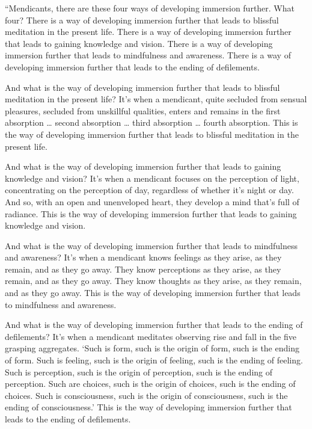 \documentclass[12pt,openany]{book}%
\begin{document}
“Mendicants, there are these four ways of developing immersion further. What four? There is a way of developing immersion further that leads to blissful meditation in the present life. There is a way of developing immersion further that leads to gaining knowledge and vision. There is a way of developing immersion further that leads to mindfulness and awareness. There is a way of developing immersion further that leads to the ending of defilements. 

And what is the way of developing immersion further that leads to blissful meditation in the present life? It’s when a mendicant, quite secluded from sensual pleasures, secluded from unskillful qualities, enters and remains in the first absorption … second absorption … third absorption … fourth absorption. This is the way of developing immersion further that leads to blissful meditation in the present life. 

And what is the way of developing immersion further that leads to gaining knowledge and vision? It’s when a mendicant focuses on the perception of light, concentrating on the perception of day, regardless of whether it’s night or day. And so, with an open and unenveloped heart, they develop a mind that’s full of radiance. This is the way of developing immersion further that leads to gaining knowledge and vision. 

And what is the way of developing immersion further that leads to mindfulness and awareness? It’s when a mendicant knows feelings as they arise, as they remain, and as they go away. They know perceptions as they arise, as they remain, and as they go away. They know thoughts as they arise, as they remain, and as they go away. This is the way of developing immersion further that leads to mindfulness and awareness. 

And what is the way of developing immersion further that leads to the ending of defilements? It’s when a mendicant meditates observing rise and fall in the five grasping aggregates. ‘Such is form, such is the origin of form, such is the ending of form. Such is feeling, such is the origin of feeling, such is the ending of feeling. Such is perception, such is the origin of perception, such is the ending of perception. Such are choices, such is the origin of choices, such is the ending of choices. Such is consciousness, such is the origin of consciousness, such is the ending of consciousness.’ This is the way of developing immersion further that leads to the ending of defilements. 
\end{document}
